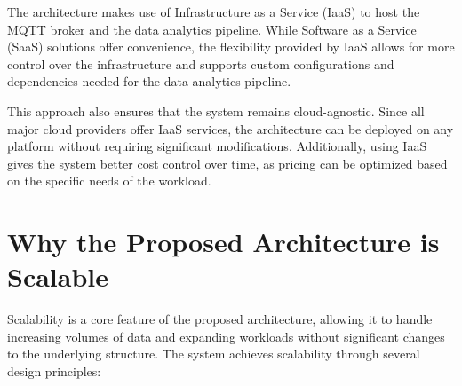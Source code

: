 The architecture makes use of Infrastructure as a Service (IaaS) to host the MQTT broker and the data analytics pipeline. While Software as a Service (SaaS) solutions offer convenience, the flexibility provided by IaaS allows for more control over the infrastructure and supports custom configurations and dependencies needed for the data analytics pipeline.

This approach also ensures that the system remains cloud-agnostic. Since all major cloud providers offer IaaS services, the architecture can be deployed on any platform without requiring significant modifications. Additionally, using IaaS gives the system better cost control over time, as pricing can be optimized based on the specific needs of the workload.

\section{Why the Proposed Architecture is Scalable}

Scalability is a core feature of the proposed architecture, allowing it to handle increasing volumes of data and expanding workloads without significant changes to the underlying structure. The system achieves scalability through several design principles:

